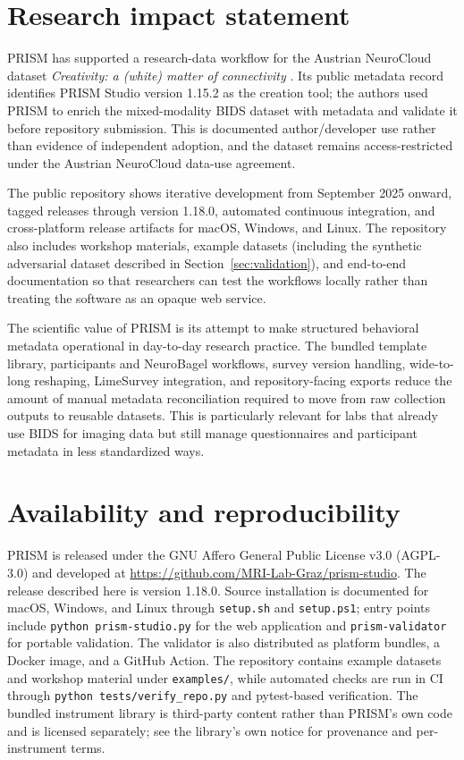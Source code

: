 \documentclass[10pt]{article}
\begin{document}
\section{Research impact statement}
\label{sec:impact}

PRISM has supported a research-data workflow for the Austrian NeuroCloud
dataset \emph{Creativity: a (white) matter of connectivity}
\citep{koschutnig2026creativity}. Its public metadata record identifies
PRISM Studio version 1.15.2 as the creation tool; the authors used PRISM to
enrich the mixed-modality BIDS dataset with metadata and validate it before
repository submission. This is documented author/developer use rather than
evidence of independent adoption, and the dataset remains access-restricted
under the Austrian NeuroCloud data-use agreement.

The public repository shows iterative development from September 2025
onward, tagged releases through version 1.18.0, automated continuous
integration, and cross-platform release artifacts for macOS, Windows, and
Linux. The repository also includes workshop materials, example datasets
(including the synthetic adversarial dataset described in
Section~\ref{sec:validation}), and end-to-end documentation so that
researchers can test the workflows locally rather than treating the software
as an opaque web service.

The scientific value of PRISM is its attempt to make structured behavioral
metadata operational in day-to-day research practice. The bundled template
library, participants and NeuroBagel workflows, survey version handling,
wide-to-long reshaping, LimeSurvey integration, and repository-facing
exports reduce the amount of manual metadata reconciliation required to move
from raw collection outputs to reusable datasets. This is particularly
relevant for labs that already use BIDS for imaging data but still manage
questionnaires and participant metadata in less standardized ways.

\section{Availability and reproducibility}

PRISM is released under the GNU Affero General Public License v3.0
(AGPL-3.0) and developed at
\url{https://github.com/MRI-Lab-Graz/prism-studio}. The release described
here is version 1.18.0. Source installation is documented for macOS,
Windows, and Linux through \texttt{setup.sh} and \texttt{setup.ps1}; entry
points include \texttt{python prism-studio.py} for the web application and
\texttt{prism-validator} for portable validation. The validator is also
distributed as platform bundles, a Docker image, and a GitHub Action. The
repository contains example datasets and workshop material under
\texttt{examples/}, while automated checks are run in CI through
\texttt{python tests/verify\_repo.py} and pytest-based verification. The
bundled instrument library is third-party content rather than PRISM's own
code and is licensed separately; see the library's own notice for
provenance and per-instrument terms.
\end{document}
